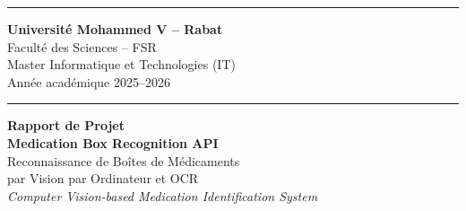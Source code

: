 \documentclass[12pt,a4paper]{report}
\newcommand{\en}[1]{\textit{\textit{#1}}}
\begin{document}
\begin{titlepage}
\pagecolor{white}
\centering
\vspace*{0.5cm}

{\color{primary}\rule{\linewidth}{2pt}}
\vspace{0.3cm}

{\large\bfseries Universit\'e Mohammed V -- Rabat}\\[0.2cm]
{\large Facult\'e des Sciences -- FSR}\\[0.1cm]
{\normalsize Master Informatique et Technologies (IT)}\\[0.1cm]
{\normalsize Ann\'ee acad\'emique 2025--2026}

\vspace{0.4cm}
{\color{primary}\rule{\linewidth}{0.8pt}}
\vspace{1cm}

\begin{tcolorbox}[colback=primary!5,colframe=primary,arc=8pt,boxrule=1.5pt]
\centering
{\LARGE\bfseries\color{primary} Rapport de Projet}\\[0.4cm]
{\huge\bfseries Medication Box Recognition API}\\[0.3cm]
{\large\color{secondary} Reconnaissance de Bo\^ites de M\'edicaments\\par Vision par Ordinateur et OCR}\\[0.2cm]
{\normalsize\color{darkgray}\en{Computer Vision-based Medication Identification System}}
\end{tcolorbox}

\vspace{0.8cm}


\vspace{1cm}


\end{titlepage}
\end{document}
